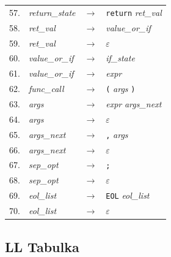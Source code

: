 \documentclass[]{ifjclass}
\begin{document}
\begin{longtable}{r l c l}
57. & \textit{return\_state} & $\rightarrow$ & \texttt{return} \textit{ret\_val} \\
58. & \textit{ret\_val}      & $\rightarrow$ & \textit{value\_or\_if} \\
59. & \textit{ret\_val}      & $\rightarrow$ & $\varepsilon$ \\
60. & \textit{value\_or\_if}  & $\rightarrow$ & \textit{if\_state} \\
61. & \textit{value\_or\_if}  & $\rightarrow$ & \textit{expr} \\
62. & \textit{func\_call}    & $\rightarrow$ & \texttt{(} \textit{args} \texttt{)} \\
63. & \textit{args}          & $\rightarrow$ & \textit{expr} \textit{args\_next} \\
64. & \textit{args}          & $\rightarrow$ & $\varepsilon$ \\
65. & \textit{args\_next}    & $\rightarrow$ & \texttt{,} \textit{args} \\
66. & \textit{args\_next}    & $\rightarrow$ & $\varepsilon$ \\
67. & \textit{sep\_opt}      & $\rightarrow$ & \texttt{;} \\
68. & \textit{sep\_opt}      & $\rightarrow$ & $\varepsilon$ \\
69. & \textit{eol\_list}     & $\rightarrow$ & \texttt{EOL} \textit{eol\_list} \\
70. & \textit{eol\_list}     & $\rightarrow$ & $\varepsilon$ \\
\end{longtable}

        \newpage
\clearpage
\subsection{LL Tabulka}
\end{document}

